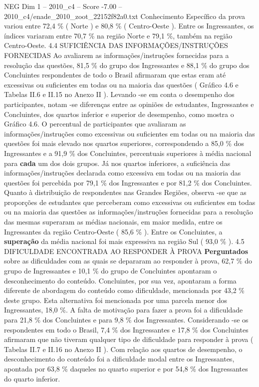 \begin{textsample}{NEG Dim 1 – 2010\_c4 – Score -7.00 – 2010\_c4/enade\_2010\_zoot\_22152f82a0.txt}
Conhecimento Específico da prova variou entre 72,4 \% ( Norte ) e 80,8 \% ( Centro-Oeste ).
Entre os Ingressantes, os índices variaram entre 70,7 \% na região Norte e 79,1 \%, também na região Centro-Oeste. 4.4 SUFICIÊNCIA DAS INFORMAÇÕES/INSTRUÇÕES FORNECIDAS Ao avaliarem as informações/instruções fornecidas para a resolução das questões, 81,5 \% do grupo dos Ingressantes e 88,1 \% do grupo dos Concluintes respondentes de todo o Brasil afirmaram que estas eram até excessivas ou suficientes em todas ou na maioria das questões ( Gráfico 4.6 e Tabelas II.6 e II.15 no Anexo II ).
Levando -se em conta o desempenho dos participantes, notam -se diferenças entre as opiniões de estudantes, Ingressantes e Concluintes, dos quartos inferior e superior de desempenho, como mostra o Gráfico 4.6.
O percentual de participantes que avaliaram as informações/instruções como excessivas ou suficientes em todas ou na maioria das questões foi mais elevado nos quartos superiores, correspondendo a 85,0 \% dos Ingressantes e a 91,9 \% dos Concluintes, percentuais superiores à média nacional para \textbf{cada} um dos dois grupos.
Já nos quartos inferiores, a suficiência das informações/instruções declarada como excessiva em todas ou na maioria das questões foi percebida por 79,1 \% dos Ingressantes e por 81,2 \% dos Concluintes.
Quanto à distribuição de respondentes nas Grandes Regiões, observa -se que as proporções de estudantes que perceberam como excessivas ou suficientes em todas ou na maioria das questões as informações/instruções fornecidas para a resolução das mesmas superaram as médias nacionais, em maior medida, entre os Ingressantes da região Centro-Oeste ( 85,6 \% ).
Entre os Concluintes, a \textbf{superação} da média nacional foi mais expressiva na região Sul ( 93,0 \% ). 4.5 DIFICULDADE ENCONTRADA AO RESPONDER À PROVA \textbf{Perguntados} sobre as dificuldades com as quais se depararam ao responder à prova, 62,7 \% do grupo de Ingressantes e 10,1 \% do grupo de Concluintes apontaram o desconhecimento do conteúdo.
Concluintes, por sua vez, apontaram a forma diferente de abordagem do conteúdo como dificuldade, mencionada por 43,2 \% deste grupo.
Esta alternativa foi mencionada por uma parcela menor dos Ingressantes, 18,0 \%.
A falta de motivação para fazer a prova foi a dificuldade para 21,8 \% dos Concluintes e para 9,8 \% dos Ingressantes.
Considerando -se os respondentes em todo o Brasil, 7,4 \% dos Ingressantes e 17,8 \% dos Concluintes afirmaram que não tiveram qualquer tipo de dificuldade para responder à prova ( Tabelas II.7 e II.16 no Anexo II ).
Com relação aos quartos de desempenho, o desconhecimento do conteúdo foi a dificuldade modal entre os Ingressantes, apontada por 63,8 \% daqueles no quarto superior e por 54,8 \% dos Ingressantes do quarto inferior.

\end{textsample}
